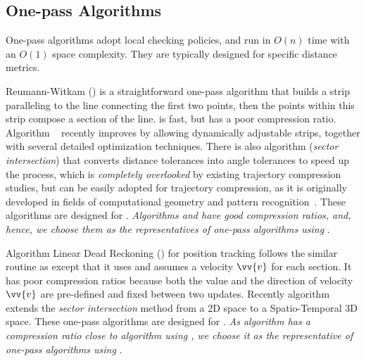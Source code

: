 \subsection{One-pass Algorithms}

One-pass algorithms adopt local checking policies, and run in $O(n)$ time with an $O(1)$ space complexity. They are typically designed for specific distance metrics.

Reumann-Witkam (\rwa) \cite{Reumann:Strip} is a straightforward one-pass algorithm that builds a strip paralleling to the line connecting the first two points, then the points within this strip compose a section of the line.  \rwa is fast, but has a poor compression ratio.
Algorithm \operb~\cite{Lin:Operb} recently improves \rwa  by allowing dynamically adjustable strips, together with several detailed optimization techniques.
%
There is also algorithm \siped (\emph{sector intersection}) that converts distance tolerances into angle tolerances to speed up the process, which is {\em completely overlooked} by existing trajectory compression studies,  but can be easily adopted for trajectory compression, as it is originally developed in fields of computational geometry and pattern recognition~\cite{Williams:Longest,Sklansky:Cone,Dunham:Cone, Zhao:Sleeve}.
%
These algorithms are designed for \ped. {\em Algorithms \operb and \siped have good compression ratios, and, hence, we choose them as the representatives of  one-pass algorithms using \ped}.


Algorithm Linear Dead Reckoning (\ldr) for position tracking \cite{Lange:Tracking,Trajcevski:DDR} follows the similar routine as \rwa except that it uses \sed and assumes a velocity ${\vv{v}}$ for each section.
It has poor compression ratios because both the value and the direction of velocity ${\vv{v}}$ are pre-defined and fixed between two updates.
Recently algorithm \cised~\cite{Lin:Cised} extends the \textit{sector intersection} method \siped from a 2D space to a Spatio-Temporal 3D space.
These one-pass algorithms are designed for \sed. {\em As algorithm \cised has a compression ratio close to algorithm \dpa using \sed, we choose it as the representative of one-pass algorithms using \sed}.


